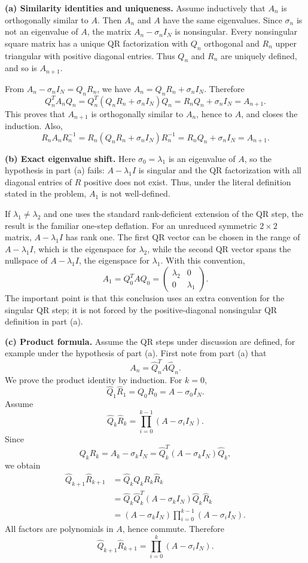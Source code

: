 \begin{solution}
\textbf{(a) Similarity identities and uniqueness.}
Assume inductively that $A_n$ is orthogonally similar to $A$. Then $A_n$ and $A$ have the
same eigenvalues. Since $\sigma_n$ is not an eigenvalue of $A$, the matrix
$A_n-\sigma_n I_N$ is nonsingular. Every nonsingular square matrix has a unique QR
factorization with $Q_n$ orthogonal and $R_n$ upper triangular with positive diagonal entries.
Thus $Q_n$ and $R_n$ are uniquely defined, and so is $A_{n+1}$.

From $A_n-\sigma_n I_N=Q_nR_n$, we have $A_n=Q_nR_n+\sigma_n I_N$. Therefore
\[
Q_n^TA_nQ_n
=Q_n^T(Q_nR_n+\sigma_n I_N)Q_n
=R_nQ_n+\sigma_n I_N
=A_{n+1}.
\]
This proves that $A_{n+1}$ is orthogonally similar to $A_n$, hence to $A$, and closes the
induction. Also,
\[
R_nA_nR_n^{-1}
=R_n(Q_nR_n+\sigma_n I_N)R_n^{-1}
=R_nQ_n+\sigma_n I_N
=A_{n+1}.
\]

\textbf{(b) Exact eigenvalue shift.}
Here $\sigma_0=\lambda_1$ is an eigenvalue of $A$, so the hypothesis in part (a) fails:
$A-\lambda_1I$ is singular and the QR factorization with all diagonal entries of $R$ positive
does not exist. Thus, under the literal definition stated in the problem, $A_1$ is not
well-defined.

If $\lambda_1\neq \lambda_2$ and one uses the standard rank-deficient extension of the QR
step, the result is the familiar one-step deflation. For an unreduced symmetric $2\times 2$
matrix, $A-\lambda_1I$ has rank one. The first QR vector can be chosen in the range of
$A-\lambda_1I$, which is the eigenspace for $\lambda_2$, while the second QR vector spans the
nullspace of $A-\lambda_1I$, the eigenspace for $\lambda_1$. With this convention,
\[
A_1=Q_0^TAQ_0=
\begin{pmatrix}
\lambda_2 & 0\\
0 & \lambda_1
\end{pmatrix}.
\]
The important point is that this conclusion uses an extra convention for the singular QR
step; it is not forced by the positive-diagonal nonsingular QR definition in part (a).

\textbf{(c) Product formula.}
Assume the QR steps under discussion are defined, for example under the hypothesis of part
(a).
First note from part (a) that
\[
A_n=\widehat{Q}_n^T A\widehat{Q}_n.
\]
We prove the product identity by induction. For $k=0$,
\[
\widehat{Q}_1\widehat{R}_1=Q_0R_0=A-\sigma_0I_N.
\]
Assume
\[
\widehat{Q}_k\widehat{R}_k=\prod_{i=0}^{k-1}(A-\sigma_iI_N).
\]
Since
\[
Q_kR_k=A_k-\sigma_kI_N
=\widehat{Q}_k^T(A-\sigma_kI_N)\widehat{Q}_k,
\]
we obtain
\begin{align*}
\widehat{Q}_{k+1}\widehat{R}_{k+1}
&=\widehat{Q}_k Q_kR_k\widehat{R}_k\\
&=\widehat{Q}_k\widehat{Q}_k^T(A-\sigma_kI_N)\widehat{Q}_k\widehat{R}_k\\
&=(A-\sigma_kI_N)\prod_{i=0}^{k-1}(A-\sigma_iI_N).
\end{align*}
All factors are polynomials in $A$, hence commute. Therefore
\[
\widehat{Q}_{k+1}\widehat{R}_{k+1}
=\prod_{i=0}^k(A-\sigma_iI_N).
\]
\end{solution}


